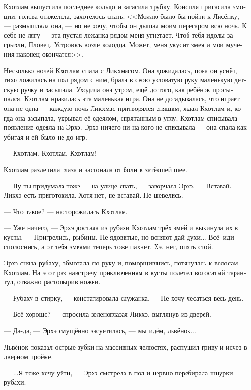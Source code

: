 \documentclass[a4paper,12pt,fleqn]{book}\usepackage{cooltooltips}\usepackage{polyglossia}\setdefaultlanguage{russian}\setotherlanguage{english}\defaultfontfeatures{Ligatures=TeX,Mapping=tex-text} \usepackage{xcolor}\definecolor{lightgray}{HTML}{bbbbbb}\color{lightgray}\newcommand{\ml}[3]{\textenglish{\textcolor{black}{#3}}}
\newcommand{\asterism}{\vspace{1em}{\centering\Large\bfseries$\ast~\ast~\ast$\par}\vspace{1em}}
\begin{document}
Кхотлам выпустила последнее кольцо и загасила трубку.
Конопля пригасила эмоции, голова отяжелела, захотелось спать.
<<Можно было бы пойти к Лисёнку, --- размышляла она, --- но не хочу, чтобы он дышал моим перегаром всю ночь.
К себе не лягу --- эта пустая лежанка рядом меня угнетает.
Чтоб тебя идолы загрызли, Пловец.
Устроюсь возле колодца.
Может, меня укусит змея и мои мучения наконец окончатся>>.

Несколько ночей Кхотлам спала с Ликхмасом.
Она дожидалась, пока он уснёт, тихо ложилась на пол рядом с ним, брала в свою узловатую руку маленькую детскую ручку и засыпала.
Уходила она утром, ещё до того, как ребёнок просыпался.
Кхотлам нравилась эта маленькая игра.
Она не догадывалась, что играет она не одна --- каждую ночь Ликхмас притворялся спящим, ждал Кхотлам и, когда она засыпала, укрывал её одеялом, спрятанным в углу.
Кхотлам списывала появление одеяла на Эрхэ.
Эрхэ ничего ни на кого не списывала --- она спала как убитая и ей было не до игр.

\asterism

--- Кхотлам.
Кхотлам.
Кхотлам!

Кхотлам разлепила глаза и застонала от боли в затёкшей шее.

--- Ну ты придумала тоже --- на улице спать, --- заворчала Эрхэ.
--- Вставай.
Ликхэ есть приготовила.
Хотя нет, не вставай.
Не шевелись.

--- Что такое? --- насторожилась Кхотлам.

--- Уже ничего, --- Эрхэ достала из рубахи Кхотлам трёх змей и выкинула их в кусты.
--- Пригрелись, рыбины.
Не ядовитые, но воняют дай духи...
Всё, иди сполоснись, а от тебя змеями теперь тоже пахнет.
Хэ, нет, опять стой.

Эрхэ сняла рубаху, обмотала ею руку и, поморщившись, потянулась к волосам Кхотлам.
На этот раз навстречу приключениям в кусты полетел волосатый тарантул, отважно растопырив ножки.

--- Рубаху в стирку, --- констатировала служанка.
--- Не хочу чесаться весь день.

--- Всё хорошо? --- спросила зеленоглазая Ликхэ, выглянув из дверей.

--- Да-да, --- Эрхэ смущённо засуетилась, --- мы идём, львёнок...

Львёнок показал острые зубки на массивных челюстях, распушил гриву и исчез в дверном проёме.

--- ...Я тоже хочу уйти, --- Эрхэ смотрела в пол и нервно перебирала шнурки рубахи.
\end{document}
